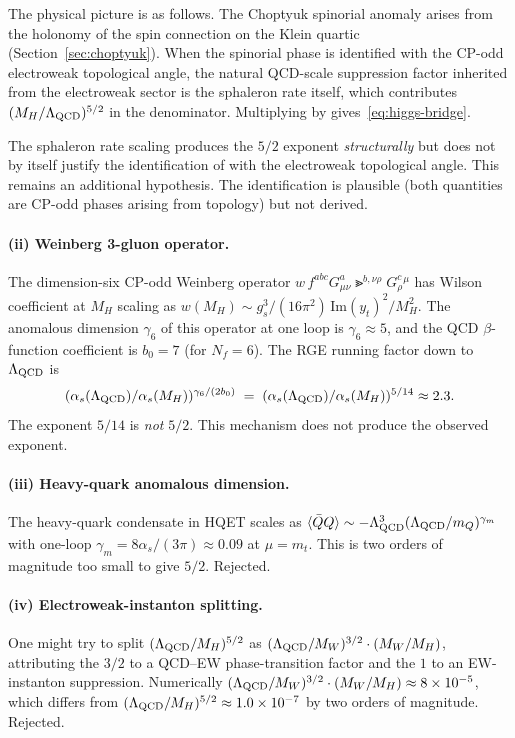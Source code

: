 The physical picture is as follows.  The Choptyuk spinorial anomaly \aC{}
arises from the holonomy of the spin connection on the Klein quartic
(Section~\ref{sec:choptyuk}).  When the spinorial phase is identified with
the CP-odd electroweak topological angle, the natural QCD-scale
suppression factor inherited from the electroweak sector is the sphaleron
rate itself, which contributes $(M_H/\Lambda_{\mathrm{QCD}})^{5/2}$ in the denominator.
Multiplying by \aC{} gives~\eqref{eq:higgs-bridge}.

\begin{caveat}
The sphaleron rate scaling produces the $5/2$ exponent \emph{structurally}
but does not by itself justify the identification of \aC{} with the
electroweak topological angle.  This remains an additional hypothesis.
The identification is plausible (both quantities are CP-odd phases
arising from topology) but not derived.
\end{caveat}

\paragraph{(ii) Weinberg 3-gluon operator.}
The dimension-six CP-odd Weinberg operator
$w\,f^{abc}G^a_{\mu\nu}\Gt^{b,\nu\rho}G^c_{\rho}{}^{\mu}$
has Wilson coefficient at $M_H$ scaling as
$w(M_H)\sim g_s^3/(16\pi^2)\,\mathrm{Im}(y_t)^2/M_H^2$.
The anomalous dimension $\gamma_6$ of this operator at one loop is
$\gamma_6 \approx 5$, and the QCD $\beta$-function coefficient is
$b_0=7$ (for $N_f=6$).  The RGE running factor down to $\Lambda_{\mathrm{QCD}}$ is
\[
  (\alpha_s(\Lambda_{\mathrm{QCD}})/\alpha_s(M_H))^{\gamma_6/(2b_0)}
  \;=\;(\alpha_s(\Lambda_{\mathrm{QCD}})/\alpha_s(M_H))^{5/14}\approx 2.3.
\]
The exponent $5/14$ is \emph{not} $5/2$.  This mechanism does not produce
the observed exponent.

\paragraph{(iii) Heavy-quark anomalous dimension.}
The heavy-quark condensate in HQET scales as
$\langle\bar Q Q\rangle \sim -\Lambda_{\mathrm{QCD}}^3(\Lambda_{\mathrm{QCD}}/m_Q)^{\gamma_m}$ with
one-loop $\gamma_m = 8\alpha_s/(3\pi) \approx 0.09$ at $\mu=m_t$.
This is two orders of magnitude too small to give $5/2$.  Rejected.

\paragraph{(iv) Electroweak-instanton splitting.}
One might try to split $(\Lambda_{\mathrm{QCD}}/M_H)^{5/2}$ as
$(\Lambda_{\mathrm{QCD}}/M_W)^{3/2}\cdot(M_W/M_H)$, attributing the $3/2$ to a QCD--EW
phase-transition factor and the $1$ to an EW-instanton suppression.
Numerically $(\Lambda_{\mathrm{QCD}}/M_W)^{3/2}\cdot(M_W/M_H)\approx 8\times 10^{-5}$,
which differs from $(\Lambda_{\mathrm{QCD}}/M_H)^{5/2}\approx 1.0\times 10^{-7}$ by two
orders of magnitude.  Rejected.

